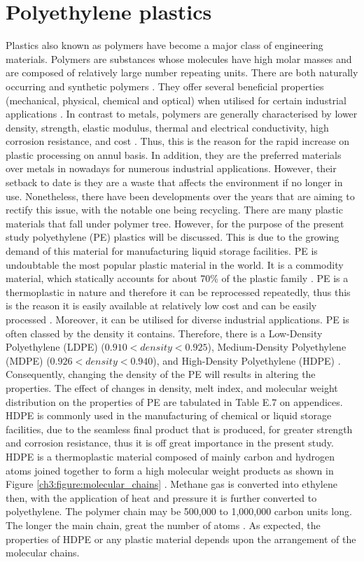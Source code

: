 \section{Polyethylene plastics}
Plastics also known as polymers have become a major class of engineering materials. Polymers are substances whose molecules have high molar masses and are composed of relatively large number repeating units. There are both naturally occurring and synthetic polymers \cite{roslan2013effect}. They offer several beneficial properties (mechanical, physical, chemical and optical) when utilised for certain industrial applications \cite{nugent2017rotational}. In contrast to metals, polymers are generally characterised by lower density, strength, elastic modulus, thermal and electrical conductivity, high corrosion resistance, and cost \cite{roslan2013effect}. Thus, this is the reason for the rapid increase on plastic processing on annul basis. In addition, they are the preferred materials over metals in nowadays for numerous industrial applications. However, their setback to date is they are a waste that affects the environment if no longer in use. Nonetheless, there have been developments over the years that are aiming to rectify this issue, with the notable one being recycling.  
There are many plastic materials that fall under polymer tree. However, for the purpose of the present study polyethylene (PE) plastics will be discussed. This is due to the growing demand of this material for manufacturing liquid storage facilities. PE is undoubtable the most popular plastic material in the world. It is a commodity material, which statically accounts for about 70\% of the plastic family \cite{roslan2013effect}.  PE is a thermoplastic in nature and therefore it can be reprocessed repeatedly, thus this is the reason it is easily available at relatively low cost and can be easily processed \cite{kurtz2009cross}. Moreover, it can be utilised for diverse industrial applications. 
PE is often classed by the density it contains. Therefore, there is a Low-Density Polyethylene (LDPE) ($0.910 < density < 0.925$), Medium-Density Polyethylene (MDPE) ($0.926 < density < 0.940$), and High-Density Polyethylene (HDPE) \cite{gabriel1998history}. Consequently, changing the density of the PE will results in altering the properties. The effect of changes in density, melt index, and molecular weight distribution on the properties of PE are tabulated in Table E.7 on appendices. 
HDPE is commonly used in the manufacturing of chemical or liquid storage facilities, due to the seamless final product that is produced, for greater strength and corrosion resistance, thus it is off great importance in the present study. HDPE is a thermoplastic material composed of mainly carbon and hydrogen atoms joined together to form a high molecular weight products as shown in Figure \ref{ch3:figure:molecular_chains} \cite{gabriel1998history}. Methane gas is converted into ethylene then, with the application of heat and pressure it is further converted to polyethylene. The polymer chain may be 500,000 to 1,000,000 carbon units long. The longer the main chain, great the number of atoms \cite{gabriel1998history}. As expected, the properties of HDPE or any plastic material depends upon the arrangement of the molecular chains. 
               
